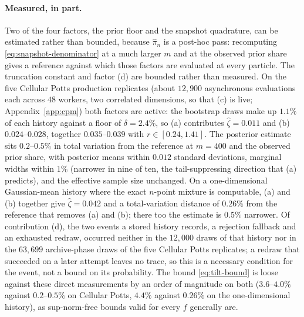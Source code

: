 \documentclass[10pt]{article}
\theoremstyle{plain}
\theoremstyle{definition}
\begin{document}
\paragraph{Measured, in part.} Two of the four factors, the prior floor and the snapshot quadrature, can be estimated rather than bounded, because $\widehat\pi_n$ is a post-hoc pass: recomputing \eqref{eq:snapshot-denominator} at a much larger $m$ and at the observed prior share gives a reference against which those factors are evaluated at every particle. The truncation constant and factor (d) are bounded rather than measured. On the five Cellular Potts production replicates (about $12{,}900$ asynchronous evaluations each across $48$ workers, two correlated dimensions, so that (c) is live; Appendix~\ref{app:cpm}) both factors are active: the bootstrap draws make up $1.1\%$ of each history against a floor of $\delta=2.4\%$, so (a) contributes $\widehat\zeta=0.011$ and (b) $0.024$--$0.028$, together $0.035$--$0.039$ with $r\in[0.24,1.41]$. The posterior estimate sits $0.2$--$0.5\%$ in total variation from the reference at $m=400$ and the observed prior share, with posterior means within $0.012$ standard deviations, marginal widths within $1\%$ (narrower in nine of ten, the tail-suppressing direction that (a) predicts), and the effective sample size unchanged. On a one-dimensional Gaussian-mean history where the exact $n$-point mixture is computable, (a) and (b) together give $\widehat\zeta=0.042$ and a total-variation distance of $0.26\%$ from the reference that removes (a) and (b); there too the estimate is $0.5\%$ narrower. Of contribution (d), the two events a stored history records, a rejection fallback and an exhausted redraw, occurred neither in the $12{,}000$ draws of that history nor in the $63{,}699$ archive-phase draws of the five Cellular Potts replicates; a redraw that succeeded on a later attempt leaves no trace, so this is a necessary condition for the event, not a bound on its probability. The bound \eqref{eq:tilt-bound} is loose against these direct measurements by an order of magnitude on both ($3.6$--$4.0\%$ against $0.2$--$0.5\%$ on Cellular Potts, $4.4\%$ against $0.26\%$ on the one-dimensional history), as sup-norm-free bounds valid for every $f$ generally are.
\end{document}
